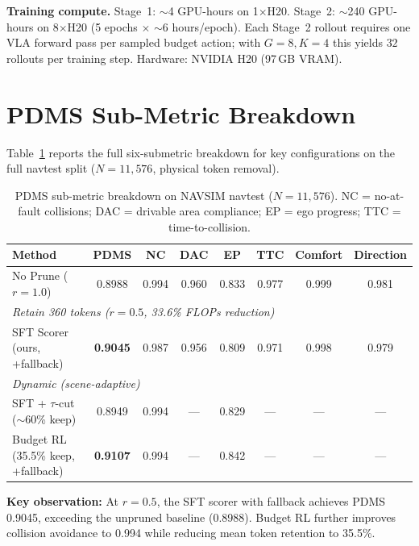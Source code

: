 \documentclass[letterpaper]{article}
\begin{document}
\textbf{Training compute.} Stage~1: $\sim$4 GPU-hours on 1$\times$H20. Stage~2: $\sim$240
GPU-hours on 8$\times$H20 (5 epochs $\times$ $\sim$6 hours/epoch). Each
Stage~2 rollout requires one VLA forward pass per sampled budget action; with $G{=}8, K{=}4$ this
yields $32$ rollouts per training step. Hardware: NVIDIA H20 (97\,GB VRAM).

\section{PDMS Sub-Metric Breakdown}
\label{sec:submetrics}

Table~\ref{tab:submetrics} reports the full six-submetric breakdown for key configurations on the
full navtest split ($N{=}11{,}576$, physical token removal).

\begin{table}[h]
\centering
\caption{PDMS sub-metric breakdown on NAVSIM navtest ($N{=}11{,}576$). NC = no-at-fault collisions;
DAC = drivable area compliance; EP = ego progress; TTC = time-to-collision.}
\label{tab:submetrics}
\small
\begin{tabular}{@{}lccccccc@{}}
\toprule
Method & PDMS & NC & DAC & EP & TTC & Comfort & Direction \\
\midrule
No Prune ($r{=}1.0$) & 0.8988 & 0.994 & 0.960 & 0.833 & 0.977 & 0.999 & 0.981 \\
\midrule
\multicolumn{8}{l}{\emph{Retain 360 tokens ($r{=}0.5$, 33.6\% FLOPs reduction)}} \\
SFT Scorer (ours, +fallback)  & \textbf{0.9045} & 0.987 & 0.956 & 0.809 & 0.971 & 0.998 & 0.979 \\
\midrule
\multicolumn{8}{l}{\emph{Dynamic (scene-adaptive)}} \\
SFT + $\tau$-cut ($\sim$60\% keep) & 0.8949 & 0.994 & --- & 0.829 & --- & --- & --- \\
Budget RL (35.5\% keep, +fallback) & \textbf{0.9107} & 0.994 & --- & 0.842 & --- & --- & --- \\
\bottomrule
\end{tabular}
\end{table}

\textbf{Key observation:} At $r{=}0.5$, the SFT scorer with fallback achieves PDMS 0.9045,
exceeding the unpruned baseline (0.8988). Budget RL further improves collision avoidance to 0.994
while reducing mean token retention to 35.5\%.
\end{document}
